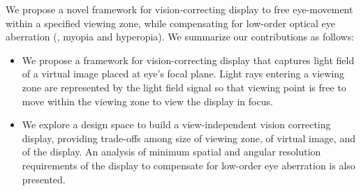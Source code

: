 We propose a novel framework for vision-correcting display to free eye-movement within a specified viewing zone, while compensating for low-order optical eye aberration (\ie, myopia and hyperopia). We summarize our contributions as follows:

\begin{itemize}
\item We propose a framework for vision-correcting display that captures light field of a virtual image placed at eye’s focal plane. Light rays entering a viewing zone are represented by the light field signal so that viewing point is free to move within the viewing zone to view the display in focus.
\item We explore a design space to build a view-independent vision correcting display, providing trade-offs among size of viewing zone, of virtual image, and of the display. An analysis of minimum spatial and angular resolution requirements of the display to compensate for low-order eye aberration is also presented.
\end{itemize}